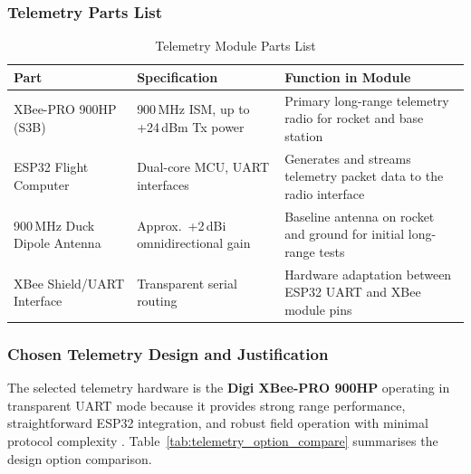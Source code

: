 \subsubsection{Telemetry Parts List}

\begin{table}[!htbp]
  \centering
  \caption{Telemetry Module Parts List}
  \label{tab:telemetry_parts}
  \small
  \renewcommand{\arraystretch}{1.2}
  \begin{tabular}{@{}p{3.3cm}|p{3.5cm}|p{6.4cm}@{}}
    \toprule
    \rowcolor{gray!22}\textbf{Part} & \textbf{Specification} & \textbf{Function in Module} \\ \midrule
    XBee-PRO 900HP (S3B) & 900\,MHz ISM, up to +24\,dBm Tx power & Primary long-range telemetry radio for rocket and base station \\
    ESP32 Flight Computer & Dual-core MCU, UART interfaces & Generates and streams telemetry packet data to the radio interface \\
    900\,MHz Duck Dipole Antenna & Approx.\ +2\,dBi omnidirectional gain & Baseline antenna on rocket and ground for initial long-range tests \\
    XBee Shield/UART Interface & Transparent serial routing & Hardware adaptation between ESP32 UART and XBee module pins \\ \bottomrule
  \end{tabular}
\end{table}

\subsubsection{Chosen Telemetry Design and Justification}

The selected telemetry hardware is the \textbf{Digi XBee-PRO 900HP} operating in
transparent UART mode because it provides strong range performance,
straightforward ESP32 integration, and robust field operation with minimal
protocol complexity \cite{xbee_manual,n4_comm_architecture,n4_xbee_integration}.
Table~\ref{tab:telemetry_option_compare} summarises the design option comparison.

